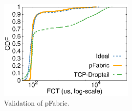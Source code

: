 \begin{figure}[h!]
\centering
\includegraphics[width=0.6\textwidth]{eval/pfabric}

\caption{Validation of pFabric.}
\label{clicknp:fig:pfabric}

\end{figure}


